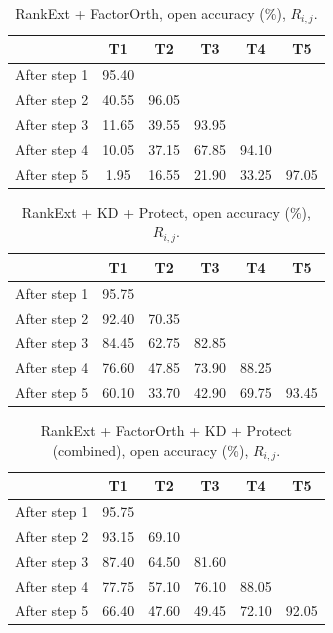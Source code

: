 \begin{table}[htbp]
\centering
\begin{tabular}{@{}l ccccc@{}}
\toprule
 & T1 & T2 & T3 & T4 & T5 \\
\midrule
After step 1 & 95.40 & & & & \\
After step 2 & 40.55 & 96.05 & & & \\
After step 3 & 11.65 & 39.55 & 93.95 & & \\
After step 4 & 10.05 & 37.15 & 67.85 & 94.10 & \\
After step 5 & 1.95 & 16.55 & 21.90 & 33.25 & 97.05 \\
\bottomrule
\end{tabular}
\caption[$R_{i,j}$ matrix -- RankExt + FactorOrth]{RankExt + FactorOrth,
open accuracy (\%), $R_{i,j}$.}
\label{tab:appA-rij-factororth}
\end{table}

\begin{table}[htbp]
\centering
\begin{tabular}{@{}l ccccc@{}}
\toprule
 & T1 & T2 & T3 & T4 & T5 \\
\midrule
After step 1 & 95.75 & & & & \\
After step 2 & 92.40 & 70.35 & & & \\
After step 3 & 84.45 & 62.75 & 82.85 & & \\
After step 4 & 76.60 & 47.85 & 73.90 & 88.25 & \\
After step 5 & 60.10 & 33.70 & 42.90 & 69.75 & 93.45 \\
\bottomrule
\end{tabular}
\caption[$R_{i,j}$ matrix -- RankExt + KD + Protect]{RankExt + KD +
Protect, open accuracy (\%), $R_{i,j}$.}
\label{tab:appA-rij-kdprotect}
\end{table}

\begin{table}[htbp]
\centering
\begin{tabular}{@{}l ccccc@{}}
\toprule
 & T1 & T2 & T3 & T4 & T5 \\
\midrule
After step 1 & 95.75 & & & & \\
After step 2 & 93.15 & 69.10 & & & \\
After step 3 & 87.40 & 64.50 & 81.60 & & \\
After step 4 & 77.75 & 57.10 & 76.10 & 88.05 & \\
After step 5 & 66.40 & 47.60 & 49.45 & 72.10 & 92.05 \\
\bottomrule
\end{tabular}
\caption[$R_{i,j}$ matrix -- RankExt combined]{RankExt + FactorOrth + KD +
Protect (combined), open accuracy (\%), $R_{i,j}$.}
\label{tab:appA-rij-combined}
\end{table}
